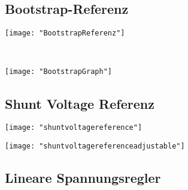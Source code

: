 \subsection{Bootstrap-Referenz}
\begin{minipage}[t]{0.3\textwidth}
	\vspace{0pt}								%
	\texttt{[image: "BootstrapReferenz"]}
\end{minipage}\hspace{0.05\textwidth}
\begin{minipage}[t]{0.3\textwidth}
	\vspace{0pt}
	\\
	
\end{minipage}
\begin{minipage}[t]{0.3\textwidth}
	\vspace{0pt}
	\texttt{[image: "BootstrapGraph"]}
\end{minipage}
\vspace{2mm}


\subsection{Shunt Voltage Referenz}
\begin{minipage}[t]{0.3\textwidth}
	\vspace{0pt}
	\texttt{[image: "shuntvoltagereference"]}
\end{minipage}\hspace{0.05\textwidth}
\begin{minipage}[t]{0.3\textwidth}
	\vspace{0pt}
	\texttt{[image: "shuntvoltagereferenceadjustable"]}
\end{minipage}
\begin{minipage}[t]{0.3\textwidth}
	\vspace{0pt}
	
\end{minipage}
\vspace{2mm}


\subsection{Lineare Spannungsregler}
